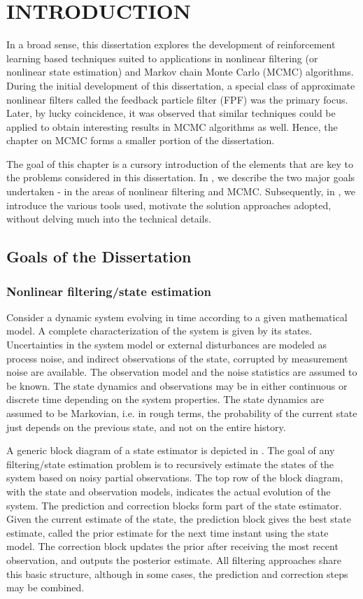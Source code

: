 \chapter{INTRODUCTION} 
\label{ch:intro}

In a broad sense, this dissertation explores the development of reinforcement learning based techniques suited to applications in nonlinear filtering (or nonlinear state estimation) and Markov chain Monte Carlo (MCMC) algorithms. During the initial development of this dissertation, a special class of approximate nonlinear filters called the feedback particle filter (FPF) was the primary focus. Later, by lucky coincidence, it was observed that similar techniques could be applied to obtain interesting results in MCMC algorithms as well. Hence, the chapter on MCMC forms a smaller portion of the dissertation. 

The goal of this chapter is a cursory introduction of the elements that are key to the problems considered in this dissertation. In , we describe the two major goals undertaken - in the areas of nonlinear filtering and MCMC. Subsequently, in , we introduce the various tools used, motivate the solution approaches adopted, without delving much into the technical details. 
\section{Goals of the Dissertation}
\label{s:goals}
\subsection{Nonlinear filtering/state estimation}
\label{s:filtering}
Consider a dynamic system evolving in time according to a given mathematical model. A complete characterization of the system is given by its states. Uncertainties in the system model or external disturbances are modeled as process noise, and indirect observations of the state, corrupted by measurement noise are available. The observation model and the noise statistics are assumed to be known. The state dynamics and observations may be in either continuous or discrete time depending on the system properties. The state dynamics are assumed to be Markovian, i.e. in rough terms, the probability of the current state just depends on the previous state, and not on the entire history. 

A generic block diagram of a state estimator is depicted in . The goal of any filtering/state estimation problem is to recursively estimate the states of the system based on noisy partial observations. The top row of the block diagram, with the state and observation models, indicates the actual evolution of the system. The prediction and correction blocks form part of the state estimator. Given the current estimate of the state, the prediction block gives the best state estimate, called the prior estimate for the next time instant using the state model. The correction block updates the prior after receiving the most recent observation, and outputs the posterior estimate. All filtering approaches share this basic structure, although in some cases, the prediction and correction steps may be combined.  

